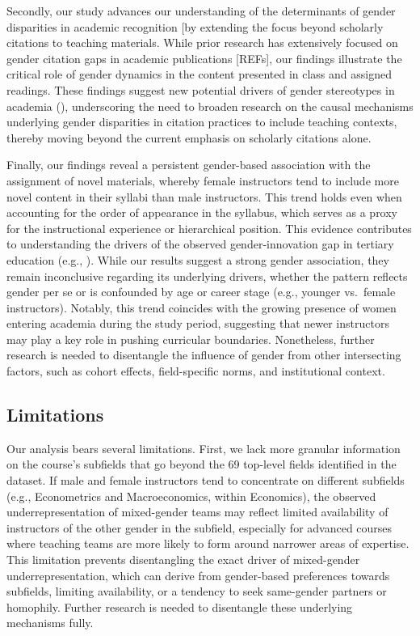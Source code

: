 \documentclass[
  12pt,
]{article}
\begin{document}
Secondly, our study advances our understanding of the determinants of gender disparities in academic recognition {[}by extending the focus beyond scholarly citations to teaching materials. While prior research has extensively focused on gender citation gaps in academic publications {[}REFs{]}, our findings illustrate the critical role of gender dynamics in the content presented in class and assigned readings. These findings suggest new potential drivers of gender stereotypes in academia (), underscoring the need to broaden research on the causal mechanisms underlying gender disparities in citation practices to include teaching contexts, thereby moving beyond the current emphasis on scholarly citations alone.

Finally, our findings reveal a persistent gender-based association with the assignment of novel materials, whereby female instructors tend to include more novel content in their syllabi than male instructors. This trend holds even when accounting for the order of appearance in the syllabus, which serves as a proxy for the instructional experience or hierarchical position. This evidence contributes to understanding the drivers of the observed gender-innovation gap in tertiary education (e.g., ). While our results suggest a strong gender association, they remain inconclusive regarding its underlying drivers, whether the pattern reflects gender per se or is confounded by age or career stage (e.g., younger vs.~female instructors). Notably, this trend coincides with the growing presence of women entering academia during the study period, suggesting that newer instructors may play a key role in pushing curricular boundaries. Nonetheless, further research is needed to disentangle the influence of gender from other intersecting factors, such as cohort effects, field-specific norms, and institutional context.

\subsection{Limitations}\label{limitations}

Our analysis bears several limitations. First, we lack more granular information on the course's subfields that go beyond the 69 top-level fields identified in the dataset. If male and female instructors tend to concentrate on different subfields (e.g., Econometrics and Macroeconomics, within Economics), the observed underrepresentation of mixed-gender teams may reflect limited availability of instructors of the other gender in the subfield, especially for advanced courses where teaching teams are more likely to form around narrower areas of expertise. This limitation prevents disentangling the exact driver of mixed-gender underrepresentation, which can derive from gender-based preferences towards subfields, limiting availability, or a tendency to seek same-gender partners or homophily. Further research is needed to disentangle these underlying mechanisms fully.
\end{document}
